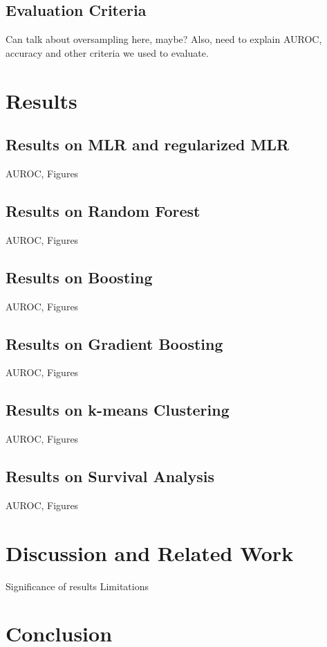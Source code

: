 \documentclass[twoside,10.5pt]{article}
\begin{document}
\subsection{Evaluation Criteria}
Can talk about oversampling here, maybe?
Also, need to explain AUROC, accuracy and other criteria we used to evaluate.

\section{Results}

\subsection{Results on MLR and regularized MLR}
AUROC, Figures 

\subsection{Results on Random Forest}
AUROC, Figures 

\subsection{Results on Boosting}
AUROC, Figures 

\subsection{Results on Gradient Boosting}
AUROC, Figures 

\subsection{Results on k-means Clustering}
AUROC, Figures 

\subsection{Results on Survival Analysis}
AUROC, Figures 


\section{Discussion and Related Work}
Significance of results
Limitations 

\section{Conclusion}

\newpage
\theendnotes


\end{document}
